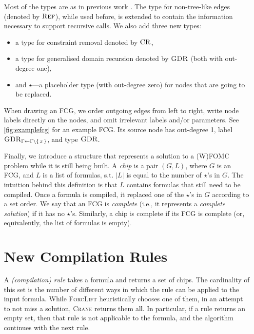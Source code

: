 \documentclass[letterpaper]{article} %
\DeclareMathOperator{\CR}{\textsc{CR}}
\DeclareMathOperator{\GDR}{\textsc{GDR}}
\DeclareMathOperator{\Reff}{\textsc{Ref}}
\theoremstyle{definition}
\begin{document}
Most of the types are as in previous work
\citep{DBLP:conf/nips/Broeck11,DBLP:conf/ijcai/BroeckTMDR11}. The type for
non-tree-like edges (denoted by $\Reff$), while used before, is extended to
contain the information necessary to support recursive calls. We also add three
new types:
\begin{itemize}
  \item a type for constraint removal denoted by $\CR$,
  \item a type for generalised domain recursion denoted by $\GDR$ (both with
        out-degree one),
  \item and $\star$---a placeholder type (with out-degree zero) for nodes that
        are going to be replaced.
\end{itemize}
When drawing an FCG, we order outgoing edges from left to right, write node
labels directly on the nodes, and omit irrelevant labels and/or parameters. See
\cref{fig:examplefcg} for an example FCG\@. Its source node has out-degree 1,
label $\GDR_{\Gamma \gets \Gamma \setminus \{\, x \,\}}$, and type $\GDR$.

Finally, we introduce a structure that represents a solution to a (W)FOMC
problem while it is still being built. A \emph{chip} is a pair $(G, L)$, where
$G$ is an FCG, and $L$ is a list of formulas, s.t. $|L|$ is equal to the number
of $\star$'s in $G$. The intuition behind this definition is that $L$ contains
formulas that still need to be compiled. Once a formula is compiled, it replaced
one of the $\star$'s in $G$ according to a set order. We say that an FCG is
\emph{complete} (i.e., it represents a \emph{complete solution}) if it has no
$\star$'s. Similarly, a chip is complete if its FCG is complete (or,
equivalently, the list of formulas is empty).

\section{New Compilation Rules}\label{sec:rules}

A \emph{(compilation) rule} takes a formula and returns a set of chips. The
cardinality of this set is the number of different ways in which the rule can be
applied to the input formula. While \textsc{ForcLift}
\citep{DBLP:conf/ijcai/BroeckTMDR11} heuristically chooses one of them, in an
attempt to not miss a solution, \textsc{Crane} returns them all. In particular,
if a rule returns an empty set, then that rule is not applicable to the formula,
and the algorithm continues with the next rule.
\end{document}
